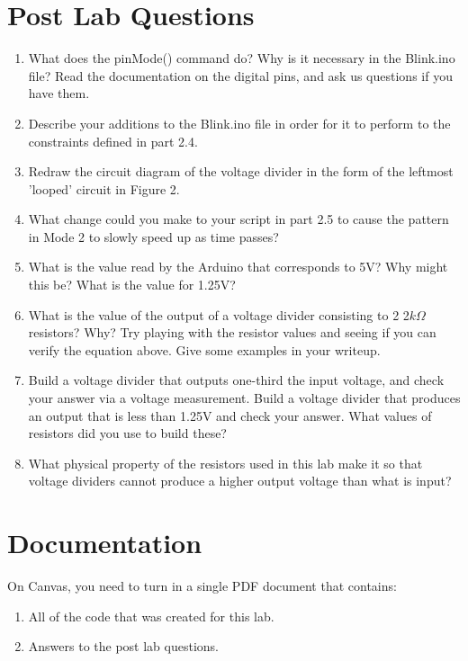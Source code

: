 \documentclass[12pt]{article}
\begin{document}
	\section*{Post Lab Questions}
	\begin{enumerate}
		\item What does the pinMode() command do? Why is it necessary in the Blink.ino file? Read the documentation on the digital pins, and ask us questions if you have them.
		
		\item Describe your additions to the Blink.ino file in order for it to perform to the constraints defined in part 2.4.
		
		\item Redraw the circuit diagram of the voltage divider in the form of the leftmost 'looped' circuit in Figure 2.
		
		\item What change could you make to your script in part 2.5 to cause the pattern in Mode 2 to slowly speed up as time passes?
		
        \item What is the value read by the Arduino that corresponds to 5V? Why might this be?  What is the value for 1.25V?
        
        \item What is the value of the output of a voltage divider consisting to 2 2$k\Omega$ resistors?  Why?  Try playing with the resistor values and seeing if you can verify the equation above. Give some examples in your writeup.
        
		\item Build a voltage divider that outputs one-third the input voltage, and check your answer via a voltage measurement. Build a voltage divider that produces an output that is less than 1.25V and check your answer. What values of resistors did you use to build these?
		
		\item What physical property of the resistors used in this lab make it so that voltage dividers cannot produce a higher output voltage than what is input?
	\end{enumerate}
    
    \section*{Documentation}
    On Canvas, you need to turn in a single PDF document that contains:
    \begin{enumerate}
    	\item All of the code that was created for this lab.
        \item Answers to the post lab questions.
    \end{enumerate}
\end{document}
